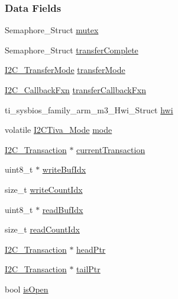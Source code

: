 \subsubsection*{Data Fields}
\begin{DoxyCompactItemize}
\item 
Semaphore\+\_\+\+Struct \hyperlink{struct_i2_c_tiva___object_ab5732612f8d726766ac03090cef2f464}{mutex}
\item 
Semaphore\+\_\+\+Struct \hyperlink{struct_i2_c_tiva___object_a04447b4f959b4882af33b78e3b05bce3}{transfer\+Complete}
\item 
\hyperlink{_i2_c_8h_a39f3b9340fc4ee241b0d2da9b2841c26}{I2\+C\+\_\+\+Transfer\+Mode} \hyperlink{struct_i2_c_tiva___object_a04f864a6f1bb4d4561fa14b3606a4012}{transfer\+Mode}
\item 
\hyperlink{_i2_c_8h_aa7389002843eba77425c73b441358fd1}{I2\+C\+\_\+\+Callback\+Fxn} \hyperlink{struct_i2_c_tiva___object_a5b74f5516b0c46a6a16c8e5df9de619d}{transfer\+Callback\+Fxn}
\item 
ti\+\_\+sysbios\+\_\+family\+\_\+arm\+\_\+m3\+\_\+\+Hwi\+\_\+\+Struct \hyperlink{struct_i2_c_tiva___object_a942b0ffaf1a7a7bfea05eeeb9ac08244}{hwi}
\item 
volatile \hyperlink{_i2_c_tiva_8h_ab6fdad6d12d7ec02e2acb6fbc1ab85af}{I2\+C\+Tiva\+\_\+\+Mode} \hyperlink{struct_i2_c_tiva___object_a8648be63f474182f93c39216dfcd980f}{mode}
\item 
\hyperlink{struct_i2_c___transaction}{I2\+C\+\_\+\+Transaction} $\ast$ \hyperlink{struct_i2_c_tiva___object_aed736876ed3cf26c69bbf7b61d450042}{current\+Transaction}
\item 
uint8\+\_\+t $\ast$ \hyperlink{struct_i2_c_tiva___object_a6e14179dcc38177ade3c5bef4404f1bb}{write\+Buf\+Idx}
\item 
size\+\_\+t \hyperlink{struct_i2_c_tiva___object_a0c98fe0fcb52da4ea29516402aae56b8}{write\+Count\+Idx}
\item 
uint8\+\_\+t $\ast$ \hyperlink{struct_i2_c_tiva___object_a6df9e5e6f703e9b23bc325bc70a3ac2a}{read\+Buf\+Idx}
\item 
size\+\_\+t \hyperlink{struct_i2_c_tiva___object_ad3b3a075a971c85b4e2a00665d208866}{read\+Count\+Idx}
\item 
\hyperlink{struct_i2_c___transaction}{I2\+C\+\_\+\+Transaction} $\ast$ \hyperlink{struct_i2_c_tiva___object_ab004ef4879f8e53ef8cfcec4c5589cdb}{head\+Ptr}
\item 
\hyperlink{struct_i2_c___transaction}{I2\+C\+\_\+\+Transaction} $\ast$ \hyperlink{struct_i2_c_tiva___object_af9dbef087eec693dd7dd41822b52b8bd}{tail\+Ptr}
\item 
bool \hyperlink{struct_i2_c_tiva___object_a8026898ec8dd40f92c6a1acdbc599832}{is\+Open}
\end{DoxyCompactItemize}


